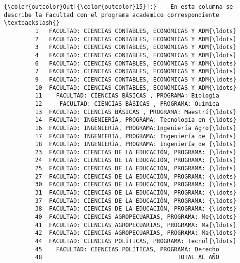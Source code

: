 \documentclass[11pt]{article}
\begin{document}
\begin{Verbatim}[commandchars=\\\{\}]
{\color{outcolor}Out[{\color{outcolor}15}]:}    En esta columna se describe la Facultad con el programa academico correspondiente   \textbackslash{}
         1   FACULTAD: CIENCIAS CONTABLES, ECONÓMICAS Y ADM{\ldots}                                   
         2   FACULTAD: CIENCIAS CONTABLES, ECONÓMICAS Y ADM{\ldots}                                   
         3   FACULTAD: CIENCIAS CONTABLES, ECONÓMICAS Y ADM{\ldots}                                   
         4   FACULTAD: CIENCIAS CONTABLES, ECONÓMICAS Y ADM{\ldots}                                   
         6   FACULTAD: CIENCIAS CONTABLES, ECONÓMICAS Y ADM{\ldots}                                   
         7   FACULTAD: CIENCIAS CONTABLES, ECONÓMICAS Y ADM{\ldots}                                   
         9   FACULTAD: CIENCIAS CONTABLES, ECONÓMICAS Y ADM{\ldots}                                   
         10  FACULTAD: CIENCIAS CONTABLES, ECONÓMICAS Y ADM{\ldots}                                   
         11    FACULTAD: CIENCIAS BÁSICAS , PROGRAMA: Biologìa                                   
         12     FACULTAD: CIENCIAS BÁSICAS , PROGRAMA: Química                                   
         13  FACULTAD: CIENCIAS BÁSICAS , PROGRAMA: Maestrí{\ldots}                                   
         14  FACULTAD: INGENIERÍA, PROGRAMA: Tecnología en {\ldots}                                   
         16  FACULTAD: INGENIERÍA, PROGRAMA:Ingeniería Agro{\ldots}                                   
         17  FACULTAD: INGENIERÍA, PROGRAMA: Ingeniería de {\ldots}                                   
         18  FACULTAD: INGENIERÍA, PROGRAMA: Ingeniería de {\ldots}                                   
         23  FACULTAD: CIENCIAS DE LA EDUCACIÓN, PROGRAMA: {\ldots}                                   
         24  FACULTAD: CIENCIAS DE LA EDUCACIÓN, PROGRAMA: {\ldots}                                   
         25  FACULTAD: CIENCIAS DE LA EDUCACIÓN, PROGRAMA: {\ldots}                                   
         27  FACULTAD: CIENCIAS DE LA EDUCACIÓN, PROGRAMA: {\ldots}                                   
         30  FACULTAD: CIENCIAS DE LA EDUCACIÓN, PROGRAMA: {\ldots}                                   
         31  FACULTAD: CIENCIAS DE LA EDUCACIÓN, PROGRAMA: {\ldots}                                   
         37  FACULTAD: CIENCIAS DE LA EDUCACIÓN, PROGRAMA: {\ldots}                                   
         38  FACULTAD: CIENCIAS DE LA EDUCACIÓN, PROGRAMA: {\ldots}                                   
         40  FACULTAD: CIENCIAS AGROPECUARIAS, PROGRAMA: Me{\ldots}                                   
         41  FACULTAD: CIENCIAS AGROPECUARIAS, PROGRAMA: Ma{\ldots}                                   
         42  FACULTAD: CIENCIAS AGROPECUARIAS, PROGRAMA: Ma{\ldots}                                   
         44  FACULTAD: CIENCIAS POLÍTICAS, PROGRAMA: Tecnol{\ldots}                                   
         45    FACULTAD: CIENCIAS POLÍTICAS, PROGRAMA: Derecho                                   
         48                                       TOTAL AL AÑO                                   
         

\end{Verbatim}
\end{document}
